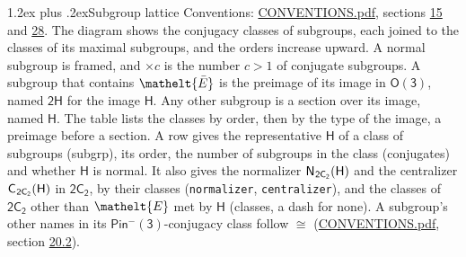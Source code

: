 \documentclass[10pt,a4paper]{article}
\makeatletter
\renewcommand\section{\@startsection{section}{1}{\z@}{-3ex plus -1ex minus -.2ex}%
  {1.2ex plus .2ex}{\normalfont\large\sffamily\bfseries\color{parttitle}}}
\numberwithin{equation}{section}
\newcommand{\eltfont}[1]{{\let\sigma\eltsigma\mathelt{#1}}}
\newcommand{\grp}[1]{\mathsf{#1}}
\newcommand{\cls}[1]{\eltfont{#1}}
\newcommand{\elt}[1]{\eltfont{#1}}
\newcommand{\samecls}{\cong}
\newcommand{\barred}[1]{\bar{#1}}
\newcommand{\hairsp}{\mkern1mu}
\makeatother
\begin{document}
\section{Subgroup lattice}\label{s:subgroups}
Conventions: \href{../../CONVENTIONS.pdf}{CONVENTIONS.pdf}, sections \href{../../../rotation/CONVENTIONS.pdf\#conv.15}{15} and \href{../../CONVENTIONS.pdf\#conv.28}{28}.
The diagram shows the conjugacy classes of subgroups, each joined to the classes of its maximal subgroups, and the orders increase upward. \label{n:index.conjugates.c}A normal subgroup is framed, and ${\times}c$ is the number $c > 1$ of conjugate subgroups. \label{n:group.H}A subgroup that contains $\elt{\barred{E}}$ is the preimage of its image in $\grp{O(3)}$, named $\grp{2H}$ for the image $\grp{H}$. Any other subgroup is a section over its image, named $\grp{H}$. The table lists the classes by order, then by the type of the image, a preimage before a section. \label{n:head.subgroup}\label{n:head.order}\label{n:head.conjugates}\label{n:head.normal}A row gives the representative $\grp{H}$ of a class of subgroups (subgrp), its order, the number of subgroups in the class (conjugates) and whether $\grp{H}$ is normal. \label{n:group.normalizer}\label{n:group.centralizer}\label{n:head.classes}It also gives the normalizer $\grp{N}_{\hairsp \grp{2C_{2}}}(\grp{H})$ and the centralizer $\grp{C}_{\hairsp \grp{2C_{2}}}(\grp{H})$ in $\grp{2C_{2}}$, by their classes (\texttt{normalizer}, \texttt{centralizer}), and the classes of $\grp{2C_{2}}$ other than $\cls{E}$ met by $\grp{H}$ (classes, a dash for none). A subgroup's other names in its \href{Pinminus3.pdf}{$\grp{Pin^{-}(3)}$}-conjugacy class follow $\samecls$ (\href{../../CONVENTIONS.pdf}{CONVENTIONS.pdf}, section \href{../../CONVENTIONS.pdf\#conv.20.2}{20.2}).
\begin{center}
\end{center}
\end{document}
